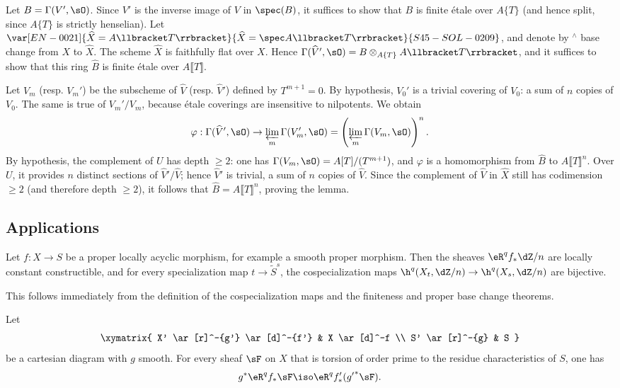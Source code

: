 Let $B=\Gamma(V',\sO)$. Since $V'$ is the inverse image of $V$ in
$\spec(B)$, it suffices to show that $B$ is finite étale over $A\{T\}$
(and hence split, since $A\{T\}$ is strictly henselian). Let
$\var[EN-0021]{\widehat X=A\llbracket T\rrbracket}{\widehat X=\spec A\llbracket T\rrbracket}{S45-SOL-0209}$, and denote by ${}^\wedge$ base
change from $X$ to $\widehat X$. The scheme $\widehat X$ is faithfully
flat over $X$. Hence
$\Gamma(\widehat V',\sO)=B\otimes_{A\{T\}}A\llbracket T\rrbracket$,
and it suffices to show that this ring $\widehat B$ is finite étale over
$A\llbracket T\rrbracket$.

Let $V_m$ (resp. $V_m'$) be the subscheme of $\widehat V$ (resp.
$\widehat V'$) defined by $T^{m+1}=0$. By hypothesis, $V_0'$ is a
trivial covering of $V_0$: a sum of $n$ copies of $V_0$. The same is true
of $V_m'/V_m$, because étale coverings are insensitive to nilpotents.
We obtain
\[
  \varphi : \Gamma(\widehat V',\sO) \to \varprojlim_m \Gamma(V_m',\sO) = \left(\varprojlim_m \Gamma(V_m,\sO)\right)^n \text{.}
\]
By hypothesis, the complement of $U$ has depth $\geqslant2$: one has
$\Gamma(V_m,\sO)=A[T]/(T^{m+1})$, and $\varphi$ is a homomorphism from
$\widehat B$ to $A\llbracket T\rrbracket^n$. Over $U$, it provides $n$
distinct sections of $\widehat V'/\widehat V$; hence $\widehat V'$ is
trivial, a sum of $n$ copies of $\widehat V$. Since the complement of
$\widehat V$ in $\widehat X$ still has codimension $\geqslant2$ (and
therefore depth $\geqslant2$), it follows that
$\widehat B=A\llbracket T\rrbracket^n$, proving the lemma.

\subsection{Applications}\label{I:5-3}

\begin{theorem}\label{I:5-3-1}
Let $f:X\to S$ be a proper locally acyclic morphism, for example a smooth
proper morphism. Then the sheaves $\eR^qf_*\dZ/n$ are locally constant
constructible, and for every specialization map $t\to\widetilde S^s$,
the cospecialization maps
$\h^q(X_t,\dZ/n)\to\h^q(X_s,\dZ/n)$ are bijective.
\end{theorem}

This follows immediately from the definition of the cospecialization maps
and the finiteness and proper base change theorems.

\begin{theorem}\label{I:5-3-2}
Let
\[\xymatrix{
  X' \ar[r]^-{g'} \ar[d]^-{f'}
    & X \ar[d]^-f \\
  S' \ar[r]^-{g}
    & S
}\]
be a cartesian diagram with $g$ smooth. For every sheaf $\sF$ on $X$
that is torsion of order prime to the residue characteristics of $S$,
one has
\[
  g^* \eR^q f_* \sF \iso \eR^q f'_*({g'}^* \sF) \text{.}
\]
\end{theorem}

